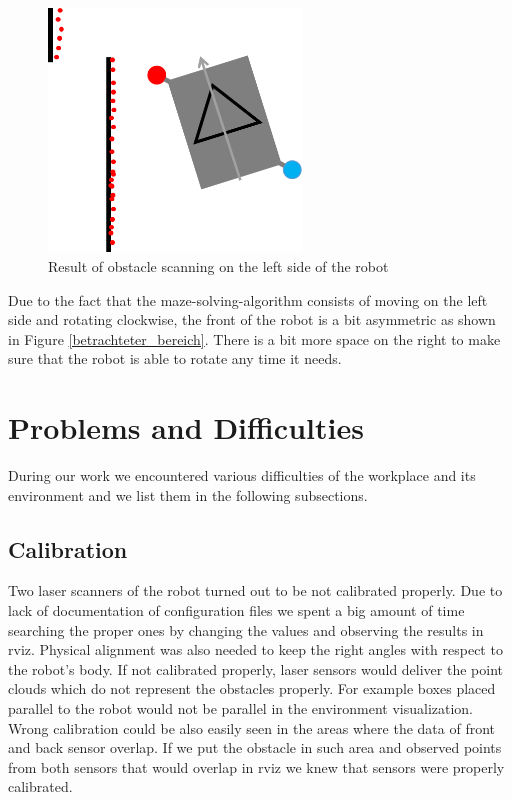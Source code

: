 \begin{figure}[ht]
\centering
\includegraphics[width=0.6\textwidth]{graphics/rotate_left_parallel01.png}
\caption{Result of obstacle scanning on the left side of the robot}
\label{rotate_left_parallel01}
\centering
\end{figure}

Due to the fact that the maze-solving-algorithm consists of moving on the left side and rotating clockwise, the front of the robot is a bit asymmetric as shown in Figure \ref{betrachteter_bereich}. There is a bit more space on the right to make sure that the robot is able to rotate any time it needs.

\section{Problems and Difficulties} \label{problems}
During our work we encountered various difficulties of the workplace and its environment and we list them in the following subsections.

\subsection{Calibration}
Two laser scanners of the robot turned out to be not calibrated properly. Due to lack of documentation of configuration files we spent a big amount of time searching the proper ones by changing the values and observing the results in rviz. Physical alignment was also needed to keep the right angles with respect to the robot's body. If not calibrated properly, laser sensors would deliver the point clouds which do not represent the obstacles properly. For example boxes placed parallel to the robot would not be parallel in the environment visualization. Wrong calibration could be also easily seen in the areas where the data of front and back sensor overlap. If we put the obstacle in such area and observed points from both sensors that would overlap in rviz we knew that sensors were properly calibrated.

